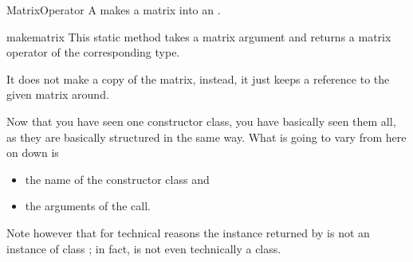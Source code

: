 \begin{classdesc*}{MatrixOperator}
  A  makes a matrix into an .
\end{classdesc*}
\begin{methoddesc}{make}{matrix}
  This static method takes a matrix argument and returns a matrix
  operator of the corresponding type.

  It does not make a copy of the matrix, instead, it just keeps
  a reference to the given matrix around.
\end{methoddesc}

Now that you have seen one constructor class, you have basically
seen them all, as they are basically structured in the same way.
What is going to vary from here on down is
\begin{itemize}
\item the name of the constructor class and
\item the arguments of the  call.
\end{itemize}
Note however that for technical reasons the instance returned by
 is not an instance of class ; 
in fact,  is not even technically a class.


